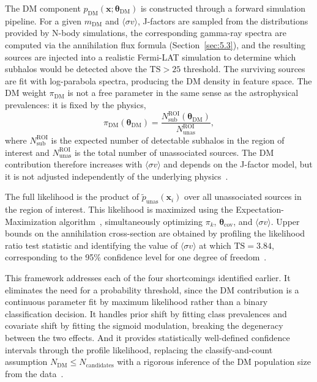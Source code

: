 The DM component $p_\mathrm{DM}(\mathbf{x};\boldsymbol{\theta}_\mathrm{DM})$ is constructed through a forward simulation pipeline.
For a given $m_\mathrm{DM}$ and $\langle\sigma v\rangle$, J-factors are sampled from the distributions provided by N-body simulations, the corresponding gamma-ray spectra are computed via the annihilation flux formula (Section~\ref{sec:5.3}), and the resulting sources are injected into a realistic Fermi-LAT simulation to determine which subhalos would be detected above the $\mathrm{TS} > 25$ threshold.
The surviving sources are fit with log-parabola spectra, producing the DM density in feature space.
The DM weight $\pi_\mathrm{DM}$ is not a free parameter in the same sense as the astrophysical prevalences: it is fixed by the physics,
\begin{equation}
	\pi_\mathrm{DM}(\boldsymbol{\theta}_\mathrm{DM}) = \frac{N_\mathrm{sub}^\mathrm{ROI}(\boldsymbol{\theta}_\mathrm{DM})}{N_\mathrm{unas}^\mathrm{ROI}},
	\label{eq:pi_dm}
\end{equation}
where $N_\mathrm{sub}^\mathrm{ROI}$ is the expected number of detectable subhalos in the region of interest and $N_\mathrm{unas}^\mathrm{ROI}$ is the total number of unassociated sources.
The DM contribution therefore increases with $\langle\sigma v\rangle$ and depends on the J-factor model, but it is not adjusted independently of the underlying physics~\cite{Amerio:2025fhz}.

The full likelihood is the product of $\tilde{p}_\mathrm{unas}(\mathbf{x}_i)$ over all unassociated sources in the region of interest.
This likelihood is maximized using the Expectation-Maximization algorithm~\cite{Saerens_2002, Bishop:2006}, simultaneously optimizing $\pi_k$, $\boldsymbol{\theta}_\mathrm{cov}$, and $\langle\sigma v\rangle$.
Upper bounds on the annihilation cross-section are obtained by profiling the likelihood ratio test statistic and identifying the value of $\langle\sigma v\rangle$ at which $\mathrm{TS} = 3.84$, corresponding to the 95\% confidence level for one degree of freedom~\cite{Amerio:2025fhz}.

This framework addresses each of the four shortcomings identified earlier.
It eliminates the need for a probability threshold, since the DM contribution is a continuous parameter fit by maximum likelihood rather than a binary classification decision.
It handles prior shift by fitting class prevalences and covariate shift by fitting the sigmoid modulation, breaking the degeneracy between the two effects.
And it provides statistically well-defined confidence intervals through the profile likelihood, replacing the classify-and-count assumption $N_\mathrm{DM} \leq N_\mathrm{candidates}$ with a rigorous inference of the DM population size from the data~\cite{Amerio:2025fhz}.

